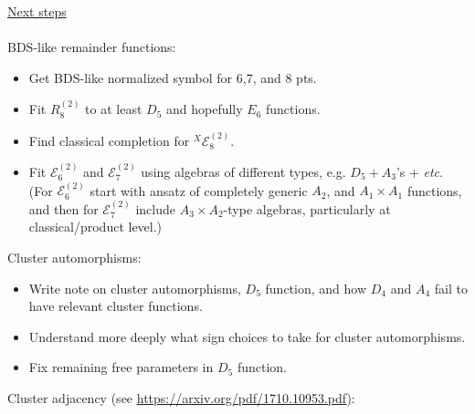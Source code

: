 \documentclass[12pt]{article}
\begin{document}
\underline{Next steps}\\ \\
BDS-like remainder functions:
\begin{itemize}
	\item Get BDS-like normalized symbol for 6,7, and 8 pts. 

	\item Fit $R^{(2)}_8$ to at least $D_5$ and hopefully $E_6$ functions.

	\item Find classical completion for ${}^X\mathcal{E}^{(2)}_8$.

	\item Fit $\mathcal{E}^{(2)}_6$ and $\mathcal{E}^{(2)}_7$ using algebras of different types, e.g. $D_5 + A_3$'s + \emph{etc}. (For $\mathcal{E}^{(2)}_6$ start with ansatz of completely generic $A_2$, and $A_1\times A_1$ functions, and then for $\mathcal{E}^{(2)}_7$ include $A_3\times A_2$-type algebras, particularly at classical/product level.)\\

\end{itemize}
Cluster automorphisms:
\begin{itemize}
	\item Write note on cluster automorphisms, $D_5$ function, and how $D_4$ and $A_4$ fail to have relevant cluster functions.

	\item Understand more deeply what sign choices to take for cluster automorphisms.

	\item Fix remaining free parameters in $D_5$ function.\\
\end{itemize}
Cluster adjacency (see \url{https://arxiv.org/pdf/1710.10953.pdf}):
\end{document}
